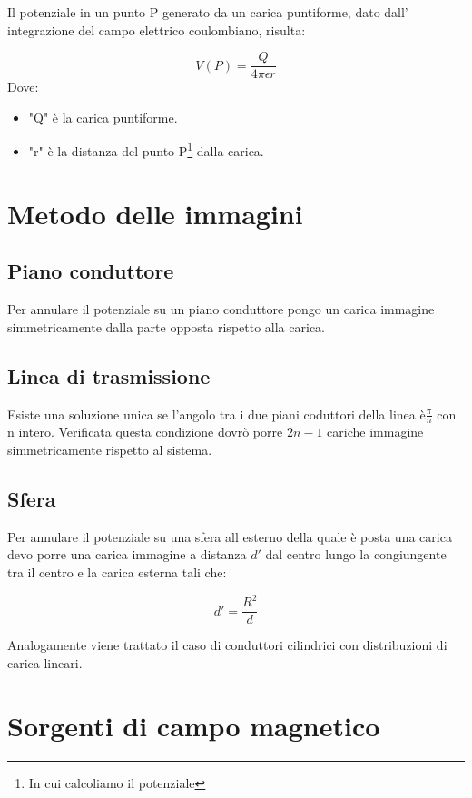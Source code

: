 \documentclass[10pt,a4paper]{report}
\begin{document}
		Il potenziale in un punto P generato da un carica puntiforme, dato dall' integrazione del campo elettrico coulombiano, risulta:

		\[
		V(P)=\frac{Q}{4\pi \epsilon r}
		\]
		Dove:
		\begin{itemize}
		\item "Q" è la carica puntiforme.

		\item "r" è la distanza del punto P\footnote{In cui calcoliamo il potenziale} dalla carica.
		\end{itemize}

\chapter{Metodo delle immagini}	


\section{Piano conduttore}

Per annulare il potenziale su un piano conduttore pongo un carica immagine simmetricamente dalla parte opposta rispetto alla carica.

\section{Linea di trasmissione}

Esiste una soluzione unica se l'angolo tra i due piani coduttori della linea è$\frac{\pi}{n}$ con n intero.
Verificata questa condizione dovrò porre $2n-1$ cariche immagine simmetricamente rispetto al sistema.

\section{Sfera}

Per annulare il potenziale su una sfera all esterno della quale è posta una carica devo porre una carica immagine a distanza $d'$ dal centro lungo la congiungente tra il centro e la carica esterna tali che:

\[
d'=\frac{R^2}{d}
\]

Analogamente viene trattato il caso di conduttori cilindrici con distribuzioni di carica lineari.

\chapter{Sorgenti di campo magnetico}
\end{document}
